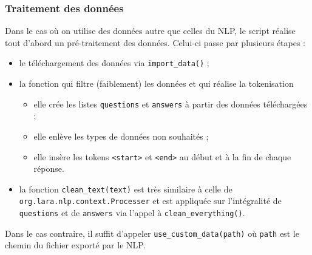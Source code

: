 \documentclass[10pt,a4paper]{article}
\begin{document}
\subsubsection{Traitement des données}
Dans le cas où on utilise des données autre que celles du NLP, le script réalise tout d'abord un pré-traitement des données. Celui-ci passe par plusieurs étapes :
\begin{itemize}
\item le téléchargement des données via \texttt{import\_data()} ;
\item la fonction qui filtre (faiblement) les données et qui réalise la tokenisation
\begin{itemize}
\item elle crée les listes \texttt{questions} et \texttt{answers} à partir des données téléchargées ;
\item elle enlève les types de données non souhaités ;
\item elle insère les tokens \texttt{<start>} et \texttt{<end>} au début et à la fin de chaque réponse.
\end{itemize}
\item la fonction \texttt{clean\_text(text)} est très similaire à celle de \texttt{org.lara.nlp.context.Processer} et est appliquée sur l'intégralité de \texttt{questions} et de \texttt{answers} via l'appel à \texttt{clean\_everything()}.
\end{itemize}
Dans le cas contraire, il suffit d'appeler \texttt{use\_custom\_data(path)} où \texttt{path} est le chemin du fichier exporté par le NLP.
 
\end{document}
